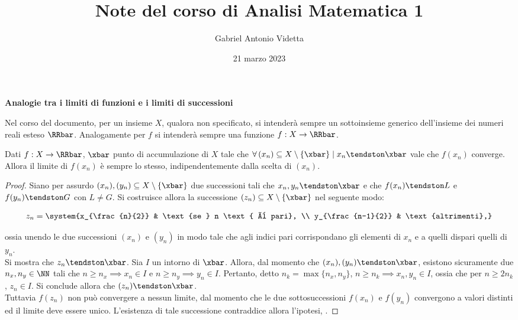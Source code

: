 \documentclass[11pt]{article}
\title{\textbf{Note del corso di Analisi Matematica 1}}
\author{Gabriel Antonio Videtta}
\date{21 marzo 2023}
\begin{document}
	
	\maketitle
	
	\begin{center}
		\Large \textbf{Analogie tra i limiti di funzioni e i limiti di successioni}
	\end{center}
	
	\begin{note} Nel corso del documento, per un insieme $X$, qualora non
		specificato, si intenderà sempre un sottoinsieme generico dell'insieme
		dei numeri reali esteso $\RRbar$. Analogamente per $f$ si intenderà
		sempre una funzione $f : X \to \RRbar$.
	\end{note}
	
	\begin{proposition}
		Dati $f : X \to \RRbar$, $\xbar$ punto di accumulazione di $X$
		tale che $\forall \, (x_n) \subseteq X \setminus \{\xbar\} \mid x_n \tendston \xbar$ vale che
		$f(x_n)$ converge. Allora il limite di $f(x_n)$ è sempre lo stesso, indipendentemente
		dalla scelta di $(x_n)$.
	\end{proposition}

	\begin{proof}
		Siano per assurdo $(x_n), (y_n) \subseteq X \setminus \{\xbar\}$ due successioni tali che
		$x_n, y_n \tendston \xbar$ e che $f(x_n) \tendston L$ e $f(y_n) \tendston G$ con $L \neq G$. Si
		costruisce allora la successione $(z_n) \subseteq X \setminus \{\xbar\}$ nel seguente modo:
		
		\[ z_n = \system{x_{\frac{n}{2}} & \text{se } n \text{ è pari}, \\ y_{\frac{n-1}{2}} & \text{altrimenti},} \]
		
		\vskip 0.05in
		
		ossia unendo le due successioni $(x_n)$ e $(y_n)$ in modo tale che agli indici pari corrispondano gli
		elementi di $x_n$ e a quelli dispari quelli di $y_n$. \\
		
		Si mostra che $z_n \tendston \xbar$. Sia $I$ un intorno di $\xbar$. Allora, dal momento che
		$(x_n), (y_n) \tendston \xbar$, esistono sicuramente due
		$n_x, n_y \in \NN$ tali che $n \geq n_x \implies x_n \in I$ e $n \geq n_y \implies y_n \in I$. Pertanto,
		detto $n_k = \max\{n_x, n_y\}$, $n \geq n_k \implies x_n, y_n \in I$, ossia che per $n \geq 2 n_k$,
		$z_n \in I$. Si conclude allora che $(z_n) \tendston \xbar$. \\
		
		Tuttavia $f(z_n)$ non può convergere a nessun limite, dal momento che le due sottosuccessioni
		$f(x_n)$ e $f(y_n)$ convergono a valori distinti ed il limite deve essere unico. L'esistenza di
		tale successione contraddice allora l'ipotesi, \Lightning.
	\end{proof}
\end{document}
